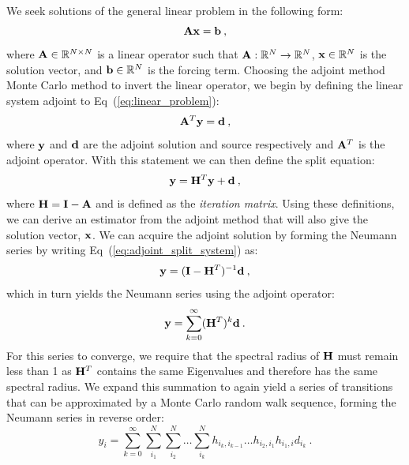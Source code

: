 \documentclass{mc2013}
\begin{document}
\label{sec:adjoint_nu}

We seek solutions of the general linear problem in the following form:
\begin{equation}
  \mathbf{A} \mathbf{x} = \mathbf{b}\:,
  \label{eq:linear_problem}
\end{equation}
where $\mathbf{A} \in \mathbb{R}^{N \times N}$ is a linear operator such
that $\mathbf{A} : \mathbb{R}^{N} \rightarrow \mathbb{R}^{N}$, $\mathbf{x} \in
\mathbb{R}^N$ is the solution vector, and $\mathbf{b} \in \mathbb{R}^N$ is
the forcing term. Choosing the adjoint method Monte Carlo method to
invert the linear operator, we begin by defining the linear system
adjoint to Eq~(\ref{eq:linear_problem}):
\begin{equation}
  \mathbf{A}^T \mathbf{y} = \mathbf{d}\:,
  \label{eq:adjoint_linear_problem}
\end{equation}
where $\mathbf{y}$ and $\mathbf{d}$ are the adjoint solution and source
respectively and $\mathbf{A}^T$ is the adjoint operator.  With this
statement we can then define the split equation:
\begin{equation}
  \mathbf{y} = \mathbf{H}^T \mathbf{y} + \mathbf{d}\:,
  \label{eq:adjoint_split_system}
\end{equation}
where $\mathbf{H} = \mathbf{I} - \mathbf{A}$ and is defined as the
\textit{iteration matrix}.  Using these definitions, we can derive an
estimator from the adjoint method that will also give the solution
vector, $\mathbf{x}$. We can acquire the adjoint solution by forming the
Neumann series by writing Eq~(\ref{eq:adjoint_split_system}) as:
\begin{equation}
  \mathbf{y} = (\mathbf{I} - \mathbf{H}^T)^{-1} \mathbf{d}\:,
  \label{eq:adjoint_split_system_2}
\end{equation}
which in turn yields the Neumann series using the adjoint operator:
\begin{equation}
  \mathbf{y} = \sum_{k=0}^{\infty} (\mathbf{H}^T)^k\mathbf{d}\:.
  \label{eq:adjoint_neumann_series}
\end{equation}
For this series to converge, we require that the spectral radius of
$\mathbf{H}$ must remain less than 1 as $\mathbf{H}^T$ contains the same
Eigenvalues and therefore has the same spectral radius. We expand this
summation to again yield a series of transitions that can be
approximated by a Monte Carlo random walk sequence, forming the
Neumann series in reverse order:
\begin{equation}
  y_i = \sum_{k=0}^{\infty}\sum_{i_1}^{N}\sum_{i_2}^{N}\ldots
  \sum_{i_k}^{N}h_{i_k,i_{k-1}}\ldots h_{i_2,i_1} h_{i_1,i} d_{i_k}\:.
  \label{eq:adjoint_neumann_solution}
\end{equation}
\end{document}
